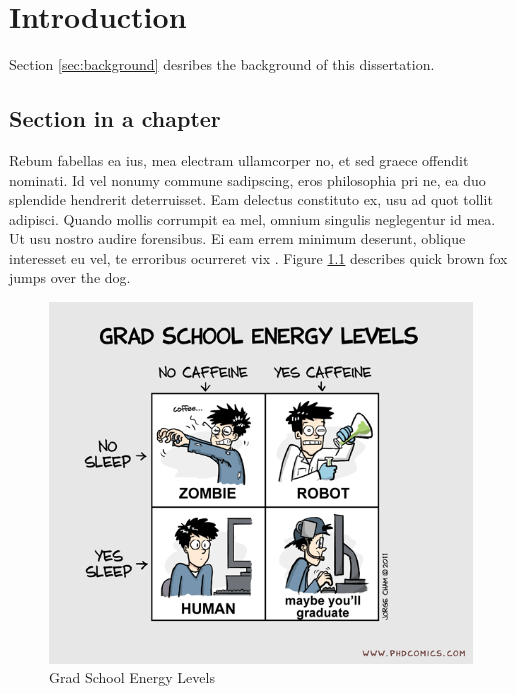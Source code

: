\documentclass[copyright, reqno]{vcuthesis}
\numberwithin{equation}{chapter}
\begin{document}
\clearpage

\chapter{Introduction \label{chap:chapintro} }
Section \ref{sec:background} desribes the background of this dissertation.
\section{ Section in a chapter \label{sec:background} }
Rebum fabellas ea ius, mea electram ullamcorper no, et sed graece offendit nominati. Id vel nonumy commune sadipscing, eros philosophia pri ne, ea duo splendide hendrerit deterruisset. Eam delectus constituto ex, usu ad quot tollit adipisci. Quando mollis corrumpit ea mel, omnium singulis neglegentur id mea. Ut usu nostro audire forensibus. Ei eam errem minimum deserunt, oblique interesset eu vel, te erroribus ocurreret vix \cite{Narendra_1990}. Figure \ref{fig:fig1} describes quick brown fox jumps over the dog.

\begin{figure}
\centering
\includegraphics[scale=0.6]{figures/phd.png}
\caption{Grad School Energy Levels}
\label{fig:fig1}
\end{figure}

\begin{table}
	\caption{\label{table:t1} Table Title}
	\vspace{0.15in}
	\centering
\end{table}
\end{document}
